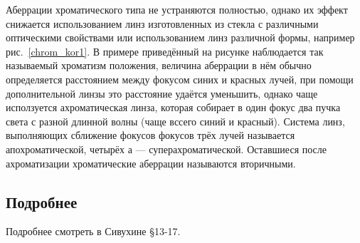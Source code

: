 Аберрации хроматического типа не устраняются полностью, однако их эффект снижается использованием линз изготовленных из стекла с различными оптическими свойствами или использованием линз различной формы, например рис.~\ref{chrom_kor1}. В примере приведённый на рисунке наблюдается так называемый хроматизм положения, величина аберрации в нём обычно определяется расстоянием между фокусом синих и красных лучей, при помощи дополнительной линзы это расстояние удаётся уменьшить, однако чаще исползуется ахроматическая линза, которая собирает в один фокус два пучка света с разной длинной волны (чаще вссего синий и красный). Система линз, выполняющих сближение фокусов фокусов трёх лучей называется апохроматической, четырёх а — суперахроматической. Оставшиеся после ахроматизации хроматические аберрации называются вторичными.
\subsection{Подробнее}
Подробнее смотреть в Сивухине \S 13-17.